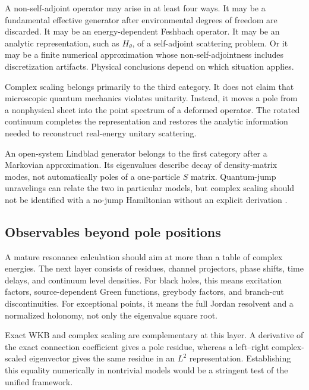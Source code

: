 A non-self-adjoint operator may arise in at least four ways.  It may be a
fundamental effective generator after environmental degrees of freedom are
discarded.  It may be an energy-dependent Feshbach operator.  It may be an
analytic representation, such as $H_\theta$, of a self-adjoint scattering
problem.  Or it may be a finite numerical approximation whose
non-self-adjointness includes discretization artifacts.  Physical conclusions
depend on which situation applies.

Complex scaling belongs primarily to the third category.  It does not claim
that microscopic quantum mechanics violates unitarity.  Instead, it moves a
pole from a nonphysical sheet into the point spectrum of a deformed operator.
The rotated continuum completes the representation and restores the analytic
information needed to reconstruct real-energy unitary scattering.

An open-system Lindblad generator belongs to the first category after a
Markovian approximation.  Its eigenvalues describe decay of density-matrix
modes, not automatically poles of a one-particle $S$ matrix.  Quantum-jump
unravelings can relate the two in particular models, but complex scaling should
not be identified with a no-jump Hamiltonian without an explicit derivation
\cite{Piilo:2008dmi,Breuer2016NonMarkovian,Gneiting:2020pew}.

\subsection{Observables beyond pole positions}
\label{subsec:beyond-poles}

A mature resonance calculation should aim at more than a table of complex
energies.  The next layer consists of residues, channel projectors, phase
shifts, time delays, and continuum level densities.  For black holes, this
means excitation factors, source-dependent Green functions, greybody factors,
and branch-cut discontinuities.  For exceptional points, it means the full
Jordan resolvent and a normalized holonomy, not only the eigenvalue square
root.

Exact WKB and complex scaling are complementary at this layer.  A derivative
of the exact connection coefficient gives a pole residue, whereas a
left--right complex-scaled eigenvector gives the same residue in an $L^2$
representation.  Establishing this equality numerically in nontrivial models
would be a stringent test of the unified framework.
